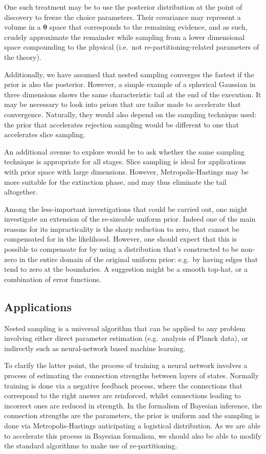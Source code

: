 \documentclass[usenatbib]{mnras}
\begin{document}
One such treatment may be to use the posterior distribution at the
point of discovery to freeze the choice parameters. Their
covariance may represent a volume in a \(\bm{\theta}\) space that
corresponds to the remaining evidence, and as such, crudely
approximate the remainder while sampling from a lower dimensional
space compounding to the physical (i.e.~not re-partitioning-related
parameters of the theory).

Additionally, we have assumed that nested sampling converges the
fastest if the prior is also the posterior. However, a simple
example of a spherical Gaussian in three dimensions shows the same
characteristic tail at the end of the execution. It may be
necessary to look into priors that are tailor made to accelerate
that convergence. Naturally, they would also depend on the sampling
technique used: the prior that accelerates rejection sampling would
be different to one that accelerates slice sampling.

An additional avenue to explore would be to ask whether the same
sampling technique is appropriate for all stages. Slice sampling is
ideal for applications with prior space with large
dimensions. However, Metropolis-Hastings may be more suitable for
the extinction phase, and may thus eliminate the tail altogether.

Among the less-important investigations that could be carried out,
one might investigate an extension of the re-sizeable uniform
prior. Indeed one of the main reasons for its impracticality is the
sharp reduction to zero, that cannot be compensated for in the
likelihood. However, one should expect that this is possible to
compensate for by using a distribution that's constructed to be
non-zero in the entire domain of the original uniform prior:
e.g.~by having edges that tend to zero at the boundaries. A
suggestion might be a smooth top-hat, or a combination of error
functions.

\subsection{Applications}\label{sec:orgc67317e}
Nested sampling is a universal algorithm that can be applied to any
problem involving either direct parameter estimation (e.g.~analysis
of Planck data), or indirectly such as neural-network based machine
learning.

To clarify the latter point, the process of training a neural
network involves a process of estimating the connection strengths
between layers of states. Normally training is done via a negative
feedback process, where the connections that correspond to the
right answer are reinforced, whilst connections leading to
incorrect ones are reduced in strength. In the formalism of
Bayesian inference, the connection strengths are the parameters,
the prior is uniform and the sampling is done via
Metropolis-Hastings anticipating a logistical distribution. As we
are able to accelerate this process in Bayesian formalism, we
should also be able to modify the standard algorithms to make use
of re-partitioning.
\end{document}
